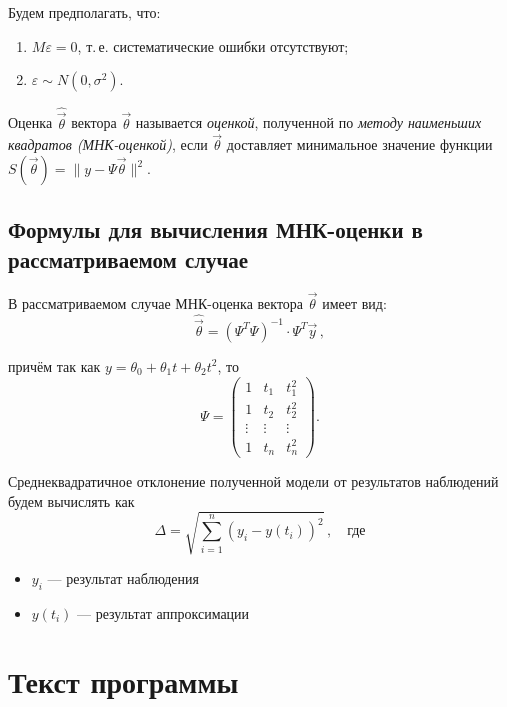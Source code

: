 Будем предполагать, что:
\begin{enumerate}
	\item $M\varepsilon = 0$, т.\,е. систематические ошибки отсутствуют;
	\item $\varepsilon \sim N(0, \sigma^2)$.
\end{enumerate}

\begin{defn}
	Оценка $\hat{\vec{\theta}}$ вектора $\vec{\theta}$ называется \emph{оценкой}, полученной по \emph{методу наименьших квадратов (МНК-оценкой)}, если $\vec{\theta}$ доставляет минимальное значение функции $S(\vec{\theta}) = \|y - \Psi \vec{\theta}\|^2$.
\end{defn}


\subsection{Формулы для вычисления МНК-оценки в рассматриваемом случае}

В рассматриваемом случае МНК-оценка вектора $\vec{\theta}$ имеет вид:
\begin{equation}
\hat{\vec{\theta}} = (\Psi^T \Psi)^{-1} \cdot \Psi^T \vec{y}\,,
\end{equation}

причём так как $y = \theta_0 + \theta_1 t + \theta_2 t^2$, то
\begin{equation}
\Psi = \begin{pmatrix}
1      & t_1    & t_1^2  \\
1      & t_2    & t_2^2  \\
\vdots & \vdots & \vdots \\
1      & t_n    & t_n^2
\end{pmatrix}.
\end{equation}


Среднеквадратичное отклонение полученной модели от результатов наблюдений будем вычислять как
\begin{equation}
\Delta = \sqrt{\sum_{i=1}^{n}\left(y_i - y(t_i)\right)^2}\,, \quad \text{где}
\end{equation}

\begin{itemize}
	\item $y_i$ --- результат наблюдения
	\item $y(t_i)$ --- результат аппроксимации
\end{itemize}



\section{Текст программы}

